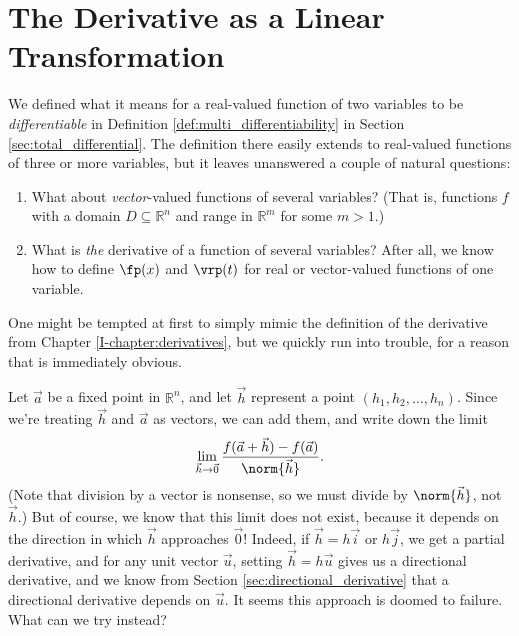 \section{The Derivative as a Linear Transformation}\label{sec:deriv_matrix}
We defined what it means for a real-valued function of two variables to be \emph{differentiable} in Definition \ref{def:multi_differentiability} in Section \ref{sec:total_differential}. The definition there easily extends to real-valued functions of three or more variables, but it leaves unanswered a couple of natural questions:
\begin{enumerate}
\item What about \emph{vector}-valued functions of several variables? (That is, functions $f$ with a domain $D\subseteq \mathbb{R}^n$ and range in $\mathbb{R}^m$ for some $m >1$.)
\item What is \emph{the} derivative of a function of several variables? After all, we know how to define $\fp(x)$ and $\vrp(t)$ for real or vector-valued functions of one variable.
\end{enumerate}
One might be tempted at first to simply mimic the definition of the derivative from Chapter \ref{I-chapter:derivatives}, but we quickly run into trouble, for a reason that is immediately obvious. 


Let $\vec{a}$ be a fixed point in $\mathbb{R}^n$, and let $\vec{h}$ represent a point $(h_1,h_2,\ldots, h_n)$. Since we're treating $\vec{h}$ and $\vec{a}$ as vectors, we can add them, and write down the limit
\[
\lim_{\vec{h}\to\vec{0}}\frac{f(\vec{a}+\vec{h})-f(\vec{a})}{\norm{\vec{h}}}.
\]
(Note that division by a vector is nonsense, so we must divide by $\norm{\vec{h}}$, not $\vec{h}$.) But of course, we know that this limit does not exist, because it depends on the direction in which $\vec{h}$ approaches $\vec{0}$! Indeed, if $\vec{h} = h\vec{i}$ or $h\vec{j}$, we get a partial derivative, and for any unit vector $\vec{u}$, setting $\vec{h}=h\vec{u}$ gives us a directional derivative, and we know from Section \ref{sec:directional_derivative} that a directional derivative depends on $\vec{u}$. It seems this approach is doomed to failure. What can we try instead?

